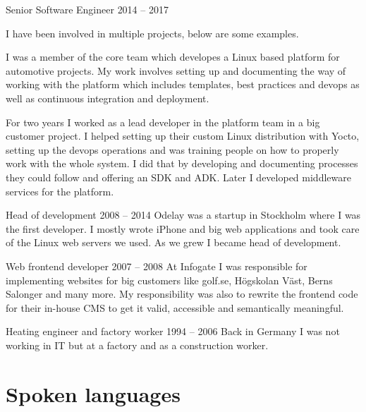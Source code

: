 \documentclass{twocolcv}
\begin{document}
           {Senior Software Engineer}
           {2014 -- 2017}
           {
             {I have been involved in multiple projects, below are some examples.\newline}
             
        {I was a member of the core team which developes a Linux based platform for automotive projects. My work involves setting up and documenting the way of working with the platform which includes templates, best practices and devops as well as continuous integration and deployment.\newline}
        
        {For two years I worked as a lead developer in the platform team in a big customer project. I helped setting up their custom Linux distribution with Yocto, setting up the devops operations and was training people on how to properly work with the whole system. I did that by developing and documenting processes they could follow and offering an SDK and ADK. Later I developed middleware services for the platform.}
}

     {Head of development}
     {2008 -- 2014}
     {Odelay was a startup in Stockholm where I was the first developer. I mostly wrote iPhone and big web applications and took care of the Linux web servers we used. As we grew I became head of development.}

     {Web frontend developer}
     {2007 -- 2008}
     {At Infogate I was responsible for implementing websites for big customers like golf.se, Högskolan Väst, Berns Salonger and many more. My responsibility was also to rewrite the frontend code for their in-house CMS to get it valid, accessible and semantically meaningful.}

     {Heating engineer and factory worker}
     {1994 -- 2006}
     {Back in Germany I was not working in IT but at a factory and as a construction worker.}
     
\section*{Spoken languages}
\end{document}

